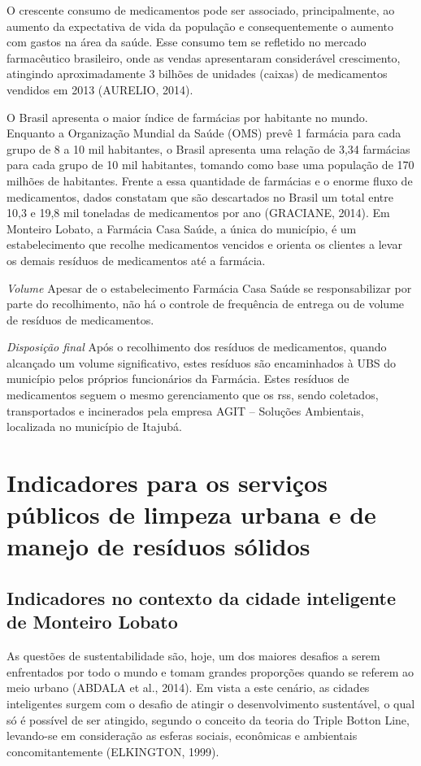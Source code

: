 \begin{description}
	O crescente consumo de medicamentos pode ser associado, principalmente, ao aumento da expectativa de vida da população e consequentemente o aumento com gastos na área da saúde. Esse consumo tem se refletido no mercado farmacêutico brasileiro, onde as vendas apresentaram considerável crescimento, atingindo aproximadamente 3 bilhões de unidades (caixas) de medicamentos vendidos em 2013 (AURELIO, 2014).
	
	O Brasil apresenta o maior índice de farmácias por habitante no mundo. Enquanto a Organização Mundial da Saúde (OMS) prevê 1 farmácia para cada grupo de 8 a 10 mil habitantes, o Brasil apresenta uma relação de 3,34 farmácias para cada grupo de 10 mil habitantes, tomando como base uma população de 170 milhões de habitantes. Frente a essa quantidade de farmácias e o enorme fluxo de medicamentos, dados constatam que são descartados no Brasil um total entre 10,3 e 19,8 mil toneladas de medicamentos por ano (GRACIANE, 2014).
	Em Monteiro Lobato, a Farmácia Casa Saúde, a única do município, é um estabelecimento que recolhe medicamentos vencidos e orienta os clientes a levar os demais resíduos de medicamentos até a farmácia.
	
	\subitem \textit{Volume}
	Apesar de o estabelecimento Farmácia Casa Saúde se responsabilizar por parte do recolhimento, não há o controle de frequência de entrega ou de volume de resíduos de medicamentos.
	
	\subitem \textit{Disposição final}
	Após o recolhimento dos resíduos de medicamentos, quando alcançado um volume significativo, estes resíduos são encaminhados à UBS do município pelos próprios funcionários da Farmácia.
	Estes resíduos de medicamentos seguem o mesmo gerenciamento que os \gls{rss}, sendo coletados, transportados e incinerados pela empresa AGIT – Soluções Ambientais, localizada no município de Itajubá.
			
\end{description}

	\section{Indicadores para os serviços públicos de limpeza urbana e de manejo de resíduos sólidos}
	
	\subsection{Indicadores no contexto da cidade inteligente de Monteiro Lobato}
	As questões de sustentabilidade são, hoje, um dos maiores desafios a serem enfrentados por todo o mundo e tomam grandes proporções quando se referem ao meio urbano (ABDALA et al., 2014). Em vista a este cenário, as cidades inteligentes surgem com o desafio de atingir o desenvolvimento sustentável, o qual só é possível de ser atingido, segundo o conceito da teoria do Triple Botton Line, levando-se em consideração as esferas sociais, econômicas e ambientais concomitantemente (ELKINGTON, 1999).
	
